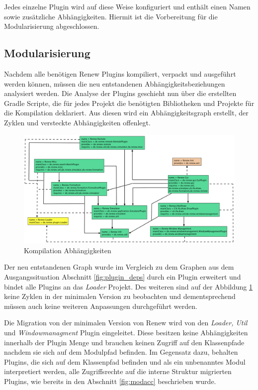 	Jedes einzelne Plugin wird auf diese Weise konfiguriert und enthält einen Namen sowie zusätzliche Abhängigkeiten. Hiermit ist die Vorbereitung für die Modularisierung abgeschlossen. 


\subsection{Modularisierung}	
	Nachdem alle benötigen Renew Plugins kompiliert, verpackt und ausgeführt werden können, müssen die neu entstandenen Abhängigkeitsbeziehungen analysiert werden. Die Analyse der Plugins geschieht nun über die erstellten Gradle Scripte, die für jedes Projekt die benötigten Bibliotheken und Projekte für die Kompilation deklariert. Aus diesen wird ein Abhängigkeitsgraph erstellt, der Zyklen und versteckte Abhängigkeiten offenlegt. \bigbreak

	\begin{figure}[h!]
	  \centering
	  \includegraphics[width=\textwidth]{material/images/deps_tree.png}
	  \caption{Kompilation Abhängigkeiten}
	  \label{fig:deps}
	\end{figure}

	Der neu entstandenen Graph wurde im Vergleich zu dem Graphen aus dem Ausgangssituation Abschnitt \ref{fig:plugin_deps} durch ein Plugin erweitert und bindet alle Plugins an das \textit{Loader} Projekt. Des weiteren sind auf der Abbildung \ref{fig:deps} keine Zyklen in der minimalen Version zu beobachten und dementsprechend müssen auch keine weiteren Anpassungen durchgeführt werden. \bigbreak

	Die Migration von der minimalen Version von Renew wird von den \textit{Loader, Util} und \textit{Windowmanagment} Plugin eingeleitet. Diese besitzen keine Abhängigkeiten innerhalb der Plugin Menge und brauchen keinen Zugriff auf den Klassenpfade nachdem sie sich auf dem Modulpfad befinden. Im Gegensatz dazu, behalten Plugins, die sich auf dem Klassenpfad befinden und als ein unbenanntes Modul interpretiert werden, alle Zugriffsrechte auf die interne Struktur migrierten Plugins, wie bereits in den Abschnitt \ref{fig:modacc} beschrieben wurde.\bigbreak

